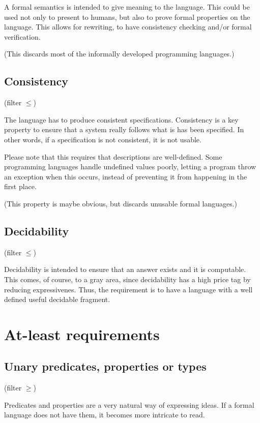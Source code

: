 A formal semantics is intended to give meaning to the language.
This could be used not only to present to humans, but also to prove formal properties on the language.
This allows for rewriting, to have consistency checking and/or formal verification.

(This discards most of the informally developed programming languages.)

\subsection{Consistency}

(filter $\leq $)

The language has to produce consistent specifications.
Consistency is a key property to ensure that a system really follows what is has been specified.
In other words, if a specification is not consistent, it is not usable.

Please note that this requires that descriptions are well-defined.
Some programming languages handle undefined values poorly, letting a program throw an exception when this occurs, instead of preventing it from happening in the first place.

(This property is maybe obvious, but discards unusable formal languages.)

\subsection{Decidability}

(filter $\leq $)

Decidability is intended to ensure that an answer exists and it is computable.
This comes, of course, to a gray area, since decidability has a high price tag by reducing expressivenes.
Thus, the requirement is to have a language with a well defined useful decidable fragment.


\section{At-least requirements}

\subsection{Unary predicates, properties or types}

(filter $\geq $)

Predicates and properties are a very natural way of expressing ideas.
If a formal language does not have them, it becomes more intricate to read.


